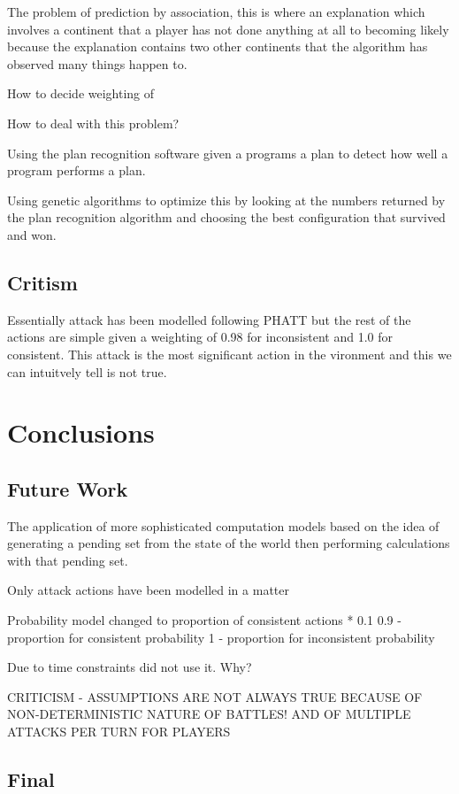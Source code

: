 \documentclass[parskip]{cs4rep}
\begin{document}
The problem of prediction by association, this is where an explanation which involves a continent that a player has not done anything at all to becoming likely because the explanation contains two other continents that the algorithm has observed many things happen to.

How to decide weighting of 

How to deal with this problem?

Using the plan recognition software given a programs a plan to detect how well a program performs a plan. 

Using genetic algorithms to optimize this by looking at the numbers returned by the plan recognition algorithm and choosing the best configuration that survived and won.

\section{Critism}

Essentially attack has been modelled following PHATT but the rest of the actions are simple given a weighting of 0.98 for inconsistent and 1.0 for consistent. This attack is the most significant action in the vironment and this we can intuitvely tell is not true.

\chapter{Conclusions}

\section{Future Work}

The application of more sophisticated computation models based on the idea of generating a pending set from the state of the world then performing calculations with that pending set.

Only attack actions have been modelled in a matter 

Probability model changed to proportion of consistent actions * 0.1 
0.9 - proportion for consistent probability
1 - proportion for inconsistent probability

Due to time constraints did not use it. Why?

CRITICISM - ASSUMPTIONS ARE NOT ALWAYS TRUE BECAUSE OF NON-DETERMINISTIC NATURE OF BATTLES! AND OF MULTIPLE ATTACKS PER TURN FOR PLAYERS

\section{Final}
\end{document}
